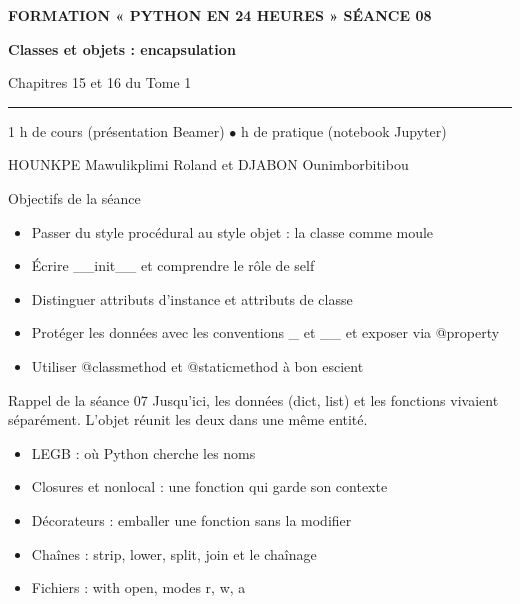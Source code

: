\documentclass[aspectratio=169,11pt]{beamer}
\begin{document}
{%
\begin{frame}[plain]
\vspace{10mm}
{\color{PyJaune}\small\bfseries FORMATION « PYTHON EN 24 HEURES » \quad\textbar\quad SÉANCE 08\par}
\vspace{4mm}
{\color{white}\Huge\bfseries Classes et objets : encapsulation\par}
\vspace{4mm}
{\color{PyBleuClair}\large Chapitres 15 et 16 du Tome 1\par}
\vspace{7mm}
{\color{PyJaune}\rule{34mm}{2.2pt}\par}
\vspace{7mm}
{\color{white}\normalsize 1 h de cours (présentation Beamer) \quad$\bullet$ h de pratique (notebook Jupyter)\par}
\vspace{2.5mm}
{\color{PyBleuClair}\normalsize HOUNKPE Mawulikplimi Roland et DJABON Ounimborbitibou\par}
\end{frame}
}
\begin{frame}{Objectifs de la séance}
\begin{itemize}
  \item Passer du style procédural au style objet : la classe comme moule
  \item Écrire \_\_init\_\_ et comprendre le rôle de self
  \item Distinguer attributs d'instance et attributs de classe
  \item Protéger les données avec les conventions \_ et \_\_ et exposer via @property
  \item Utiliser @classmethod et @staticmethod à bon escient
\end{itemize}
\end{frame}
\begin{frame}{Rappel de la séance 07}
Jusqu'ici, les données (dict, list) et les fonctions vivaient séparément. L'objet réunit les deux dans une même entité.

\begin{itemize}
  \item LEGB : où Python cherche les noms
  \item Closures et nonlocal : une fonction qui garde son contexte
  \item Décorateurs : emballer une fonction sans la modifier
  \item Chaînes : strip, lower, split, join et le chaînage
  \item Fichiers : with open, modes r, w, a
\end{itemize}
\end{frame}
\end{document}
